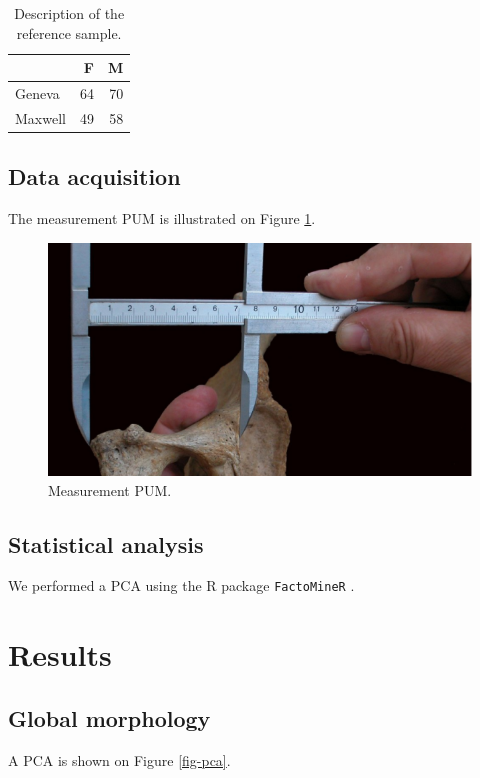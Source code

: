 \documentclass{elsarticle}
\begin{document}
\begin{table}[htbp]
\centering
\begin{tabular}{lrr}
 & F & M\\
\hline
Geneva & 64 & 70\\
Maxwell & 49 & 58\\
\end{tabular}
\caption{Description of the reference sample. \label{tab-sample}}

\end{table}

\subsection{Data acquisition}
\label{sec:org21218be}
The measurement PUM is illustrated on Figure \ref{fig-pum}.

\begin{figure}[htbp]
\centering
\includegraphics[width=0.5 \textwidth]{./pum.png}
\caption{Measurement PUM. \label{fig-pum}}
\end{figure}

\subsection{Statistical analysis}
\label{sec:org6d61bfe}
We performed a PCA using the R package \texttt{FactoMineR} \citep{le2008_FactoMineRPackageMultivariate}.

\section{Results}
\label{sec:org4aeaba0}
\subsection{Global morphology}
\label{sec:org0f3420c}
A PCA is shown on Figure \ref{fig-pca}.
\end{document}
